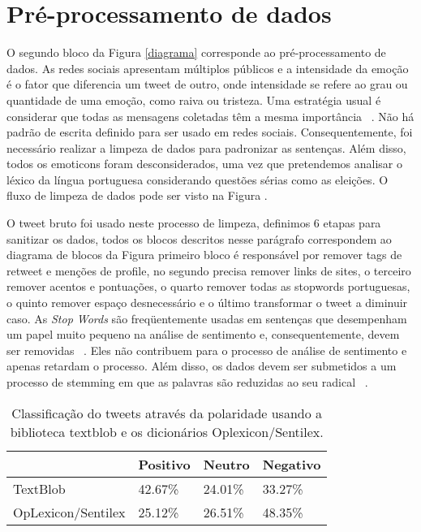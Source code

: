 %


\section{Pré-processamento de dados}

O segundo bloco da Figura \ref{diagrama} corresponde ao pré-processamento
de dados. As redes sociais apresentam múltiplos
públicos e a intensidade da emoção é o fator que diferencia um tweet de outro, onde intensidade se refere ao
grau ou quantidade de uma emoção, como raiva ou tristeza.
Uma estratégia usual é considerar que todas as mensagens
coletadas têm a mesma importância ~\cite{de2015estrategia}.
Não há padrão de escrita definido para ser usado em redes
sociais. Consequentemente, foi necessário realizar a limpeza
de dados para padronizar as sentenças. Além disso, todos os
emoticons foram desconsiderados, uma vez que pretendemos
analisar o léxico da língua portuguesa considerando questões
sérias como as eleições. O fluxo de limpeza de dados pode
ser visto na Figura .


O tweet bruto foi usado neste processo de limpeza, definimos
6 etapas para sanitizar os dados, todos os blocos
descritos nesse parágrafo correspondem ao diagrama de blocos
da Figura  primeiro bloco é responsável por remover tags de
retweet e menções de profile, no segundo precisa remover links
de sites, o terceiro remover acentos e pontuações, o quarto
remover todas as stopwords portuguesas, o quinto remover
espaço desnecessário e o último transformar o tweet a diminuir
caso.
As \textit{Stop Words} são freqüentemente usadas em sentenças
que desempenham um papel muito pequeno na análise de sentimento e, consequentemente, devem ser removidas ~\cite{sharma}.
Eles não contribuem para o processo de análise de sentimento
e apenas retardam o processo. Além disso, os dados devem ser
submetidos a um processo de stemming em que as palavras
são reduzidas ao seu radical ~\cite{de2015estrategia}.



    \begin{table}
        \centering
        \caption{Classificação do tweets através da polaridade usando a
        biblioteca textblob e os dicionários Oplexicon/Sentilex.}
        \label{table1}
        \begin{tabular}{llll}
        \hline
                  & Positivo & Neutro & Negativo \\ \hline
        TextBlob  & 42.67\%  & 24.01\% & 33.27\%  \\ \hline
        OpLexicon/Sentilex & 25.12\%  & 26.51\% & 48.35\%  \\ \hline
        \end{tabular}
        \end{table}




